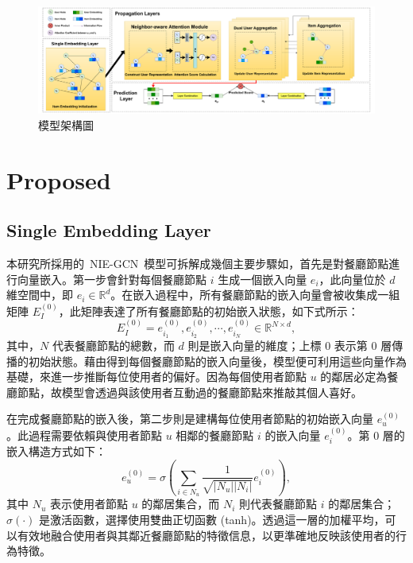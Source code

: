 \begin{figure}[htbp]
    \centering
    \includegraphics[width=\textwidth]{img/Model.pdf} %
    \caption{模型架構圖}
    \label{Model}
\end{figure}

\section{Proposed}
\subsection{Single Embedding Layer}
    本研究所採用的~NIE-GCN\cite{NIE-GCN}~模型可拆解成幾個主要步驟如，首先是對餐廳節點進行向量嵌入。第一步會針對每個餐廳節點 $i$ 生成一個嵌入向量 $e_i$，此向量位於 $d$ 維空間中，即 $e_i \in \mathbb{R}^d$。在嵌入過程中，所有餐廳節點的嵌入向量會被收集成一組矩陣 $E_I^{(0)}$，此矩陣表達了所有餐廳節點的初始嵌入狀態，如下式所示： 
    \begin{equation} 
        E_I^{(0)} = {e_{i_1}^{(0)}, e_{i_2}^{(0)},\cdots,e_{i_N}^{(0)}} \in \mathbb{R}^{N \times d}, 
    \end{equation}
    其中，$N$ 代表餐廳節點的總數，而 $d$ 則是嵌入向量的維度；上標 $0$ 表示第 0 層傳播的初始狀態。藉由得到每個餐廳節點的嵌入向量後，模型便可利用這些向量作為基礎，來進一步推斷每位使用者的偏好。因為每個使用者節點 $u$ 的鄰居必定為餐廳節點，故模型會透過與該使用者互動過的餐廳節點來推敲其個人喜好。

    在完成餐廳節點的嵌入後，第二步則是建構每位使用者節點的初始嵌入向量 $e_u^{(0)}$。此過程需要依賴與使用者節點 $u$ 相鄰的餐廳節點 $i$ 的嵌入向量 $e_i^{(0)}$。第 0 層的嵌入構造方式如下： 
    \begin{equation} 
        e_u^{(0)} = \sigma \left(\sum_{i \in N_u} \frac{1}{\sqrt{\vert N_u \vert \vert N_i \vert}}e_i^{(0)}\right), 
        \label{eq-e_u^0}
    \end{equation} 
    其中 $N_u$ 表示使用者節點 $u$ 的鄰居集合，而 $N_i$ 則代表餐廳節點 $i$ 的鄰居集合；$\sigma(\cdot)$ 是激活函數，選擇使用雙曲正切函數 (tanh)。透過這一層的加權平均，可以有效地融合使用者與其鄰近餐廳節點的特徵信息，以更準確地反映該使用者的行為特徵。

